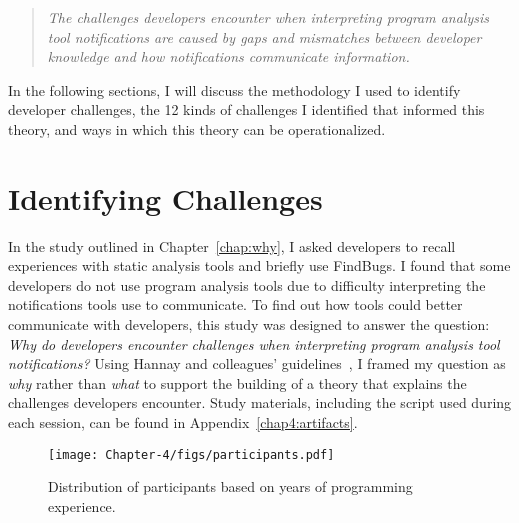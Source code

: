 \begin{quotation}
	\noindent
	\emph{The challenges developers encounter when interpreting program analysis tool notifications are caused by gaps and mismatches between developer knowledge and how notifications communicate information.}
\end{quotation}

In the following sections, I will discuss the methodology I used to identify developer challenges, the 12 kinds of challenges I identified that informed this theory, and ways in which this theory can be operationalized.	

\section{Identifying Challenges}



In the study outlined in Chapter~\ref{chap:why}, I asked developers to recall experiences with static analysis tools and briefly use FindBugs. I found that some developers do not use program analysis tools due to difficulty interpreting the notifications tools use to communicate. 
To find out how tools could better communicate with developers, this study was designed to answer the
question: \noindent\emph{Why do developers encounter challenges when interpreting program analysis tool notifications?} Using Hannay and colleagues' guidelines~\cite{hannay2007systematic}, 
I framed my question as \emph{why} rather than \emph{what} to support the building of a theory that explains the challenges developers encounter.
Study materials, including the script used during each session, can be found in Appendix~\ref{chap4:artifacts}.

\begin{figure*} [ht]
\centering
\texttt{[image: Chapter-4/figs/participants.pdf]}
\caption{Distribution of participants based on years of programming
experience.}
\label{fig:participants}
\end{figure*}

